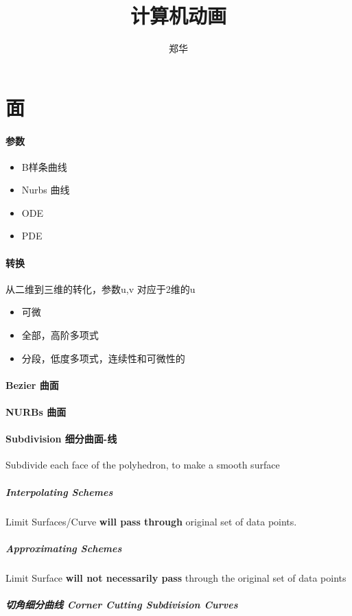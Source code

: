 \documentclass[UTF8,a4paper,8pt]{ctexart}
\author{郑华}
\title{计算机动画}
\begin{document}
 	\maketitle

\newpage
\section{面}  
   \paragraph{参数}
	   \begin{itemize}
		   	\item B样条曲线
		   	\item Nurbs 曲线
		   	\item ODE
		   	\item PDE
	   \end{itemize} 
	 
	 \paragraph{转换}
		 从二维到三维的转化，参数u,v 对应于2维的u
		 \begin{itemize}
		 	\item 可微
		 	\item 全部，高阶多项式
		 	\item 分段，低度多项式，连续性和可微性的
		 \end{itemize} 
		 
	 \paragraph{Bezier 曲面}
	 \paragraph{NURBs  曲面}
	 \paragraph{Subdivision 细分曲面-线}Subdivide each face of the polyhedron, to make a smooth surface
		 \subparagraph{Interpolating Schemes}Limit Surfaces/Curve \textbf{will pass through} original set of data points.
		 \subparagraph{Approximating Schemes}Limit Surface \textbf{will not necessarily pass} through the original set of data points
		 
		 \subparagraph{切角细分曲线 Corner Cutting Subdivision Curves}
		 
\end{document}
